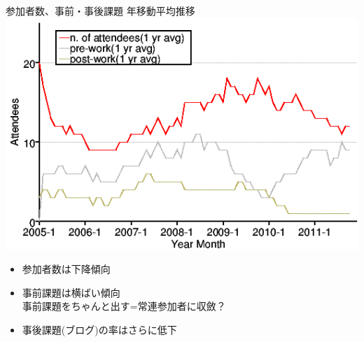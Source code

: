 \begin{frame}{参加者数、事前・事後課題 年移動平均推移}
 \includegraphics[width=0.7\hsize]{image201112/memberanalysis/attend.png}
\begin{itemize}
\item 参加者数は下降傾向
\item 事前課題は横ばい傾向\\
  事前課題をちゃんと出す=常連参加者に収斂？
\item 事後課題(ブログ)の率はさらに低下
\end{itemize}
\end{frame}

